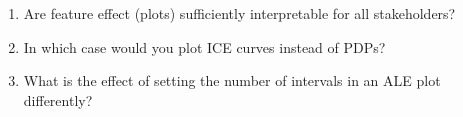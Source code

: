 \begin{enumerate}
\item Are feature effect (plots) sufficiently interpretable for all stakeholders?
\item In which case would you plot ICE curves instead of PDPs?
\item What is the effect of setting the number of intervals in an ALE plot differently?
\end{enumerate}
